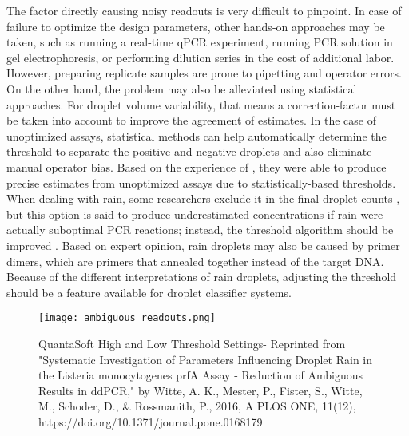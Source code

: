 The factor directly causing noisy readouts is very difficult to pinpoint. In case of failure to optimize the design parameters, other hands-on approaches may be taken, such as running a real-time qPCR experiment, running PCR solution in gel electrophoresis, or performing dilution series in the cost of additional labor. However, preparing replicate samples are prone to pipetting and operator errors. On the other hand, the problem may also be alleviated using statistical approaches. For droplet volume variability, that means a correction-factor must be taken into account to improve the agreement of estimates. In the case of unoptimized assays, statistical methods can help automatically determine the threshold to separate the positive and negative droplets and also eliminate manual operator bias. Based on the experience of , they were able to produce precise estimates from unoptimized assays due to statistically-based thresholds. When dealing with rain, some researchers exclude it in the final droplet counts \cite{Jones2014}, but this option is said to produce underestimated concentrations if rain were actually suboptimal PCR reactions; instead, the threshold algorithm should be improved \cite{Trypsteen2015}. Based on expert opinion, rain droplets may also be caused by primer dimers, which are primers that annealed together instead of the target DNA. Because of the different interpretations of rain droplets, adjusting the threshold should be a feature available for droplet classifier systems.

\begin{figure}[h]
    \centering
    \texttt{[image: ambiguous\_readouts.png]}
    \caption[QuantaSoft High and Low Threshold Settings]{QuantaSoft High and Low Threshold Settings- Reprinted from "Systematic Investigation of Parameters Influencing Droplet Rain in the Listeria monocytogenes prfA Assay - Reduction of Ambiguous Results in ddPCR," by Witte, A. K., Mester, P., Fister, S., Witte, M., Schoder, D., \& Rossmanith, P., 2016, A PLOS ONE, 11(12), https://doi.org/10.1371/journal.pone.0168179}
        \label{fig:quantasoftThreshold}
\end{figure}

